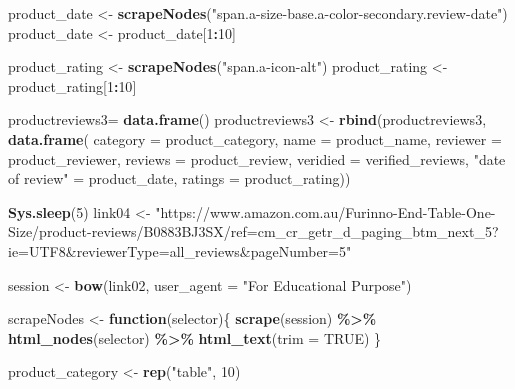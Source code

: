 \documentclass[
]{article}
\newenvironment{Shaded}{\begin{snugshade}}{\end{snugshade}}
\newcommand{\AttributeTok}[1]{\textcolor[rgb]{0.13,0.29,0.53}{#1}}
\newcommand{\ConstantTok}[1]{\textcolor[rgb]{0.56,0.35,0.01}{#1}}
\newcommand{\ControlFlowTok}[1]{\textcolor[rgb]{0.13,0.29,0.53}{\textbf{#1}}}
\newcommand{\DecValTok}[1]{\textcolor[rgb]{0.00,0.00,0.81}{#1}}
\newcommand{\FunctionTok}[1]{\textcolor[rgb]{0.13,0.29,0.53}{\textbf{#1}}}
\newcommand{\NormalTok}[1]{#1}
\newcommand{\OtherTok}[1]{\textcolor[rgb]{0.56,0.35,0.01}{#1}}
\newcommand{\SpecialCharTok}[1]{\textcolor[rgb]{0.81,0.36,0.00}{\textbf{#1}}}
\newcommand{\StringTok}[1]{\textcolor[rgb]{0.31,0.60,0.02}{#1}}
\begin{document}
\begin{Shaded}
\begin{Highlighting}[]
\NormalTok{  product\_date }\OtherTok{\textless{}{-}} \FunctionTok{scrapeNodes}\NormalTok{(}\StringTok{"span.a{-}size{-}base.a{-}color{-}secondary.review{-}date"}\NormalTok{)}
\NormalTok{  product\_date }\OtherTok{\textless{}{-}}\NormalTok{ product\_date[}\DecValTok{1}\SpecialCharTok{:}\DecValTok{10}\NormalTok{]}
  
\NormalTok{  product\_rating }\OtherTok{\textless{}{-}} \FunctionTok{scrapeNodes}\NormalTok{(}\StringTok{"span.a{-}icon{-}alt"}\NormalTok{)}
\NormalTok{  product\_rating }\OtherTok{\textless{}{-}}\NormalTok{ product\_rating[}\DecValTok{1}\SpecialCharTok{:}\DecValTok{10}\NormalTok{]}
  
\NormalTok{  productreviews3}\OtherTok{=} \FunctionTok{data.frame}\NormalTok{()}
\NormalTok{  productreviews3 }\OtherTok{\textless{}{-}} \FunctionTok{rbind}\NormalTok{(productreviews3, }\FunctionTok{data.frame}\NormalTok{(}
                      \AttributeTok{category =}\NormalTok{ product\_category,}
                      \AttributeTok{name =}\NormalTok{ product\_name,}
                      \AttributeTok{reviewer =}\NormalTok{ product\_reviewer,}
                      \AttributeTok{reviews =}\NormalTok{ product\_review,}
                      \AttributeTok{veridied =}\NormalTok{ verified\_reviews,}
                      \StringTok{"date of review"} \OtherTok{=}\NormalTok{ product\_date,}
                      \AttributeTok{ratings =}\NormalTok{ product\_rating))}
  
   \FunctionTok{Sys.sleep}\NormalTok{(}\DecValTok{5}\NormalTok{)}
\NormalTok{link04 }\OtherTok{\textless{}{-}} \StringTok{"https://www.amazon.com.au/Furinno{-}End{-}Table{-}One{-}Size/product{-}reviews/B0883BJ3SX/ref=cm\_cr\_getr\_d\_paging\_btm\_next\_5?ie=UTF8\&reviewerType=all\_reviews\&pageNumber=5"}


\NormalTok{  session }\OtherTok{\textless{}{-}} \FunctionTok{bow}\NormalTok{(link02,}
               \AttributeTok{user\_agent =} \StringTok{"For Educational Purpose"}\NormalTok{)}

\NormalTok{  scrapeNodes }\OtherTok{\textless{}{-}} \ControlFlowTok{function}\NormalTok{(selector)\{}
    \FunctionTok{scrape}\NormalTok{(session) }\SpecialCharTok{\%\textgreater{}\%}
      \FunctionTok{html\_nodes}\NormalTok{(selector) }\SpecialCharTok{\%\textgreater{}\%}
      \FunctionTok{html\_text}\NormalTok{(}\AttributeTok{trim =} \ConstantTok{TRUE}\NormalTok{)}
\NormalTok{  \}}

\NormalTok{  product\_category }\OtherTok{\textless{}{-}} \FunctionTok{rep}\NormalTok{(}\StringTok{"table"}\NormalTok{, }\DecValTok{10}\NormalTok{)}


\end{Highlighting}
\end{Shaded}
\end{document}
